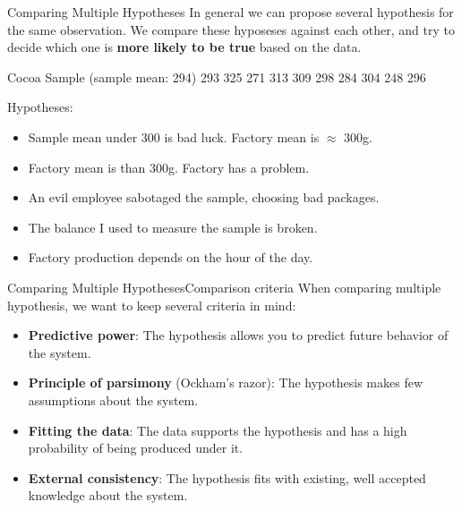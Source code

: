 \begin{frame}{Comparing Multiple Hypotheses}
  In general we can propose several hypothesis for the same observation. We  compare these hyposeses against each other, and try to decide which one is {\bf more likely to be true} based on the data.

  \begin{block}{Cocoa Sample (sample mean: 294)}
    293 325 \alert{271} 313 309 298 284 304 \alert{248} 296\\
  \end{block}\bigskip

  Hypotheses:
  \begin{itemize}
    \item Sample mean under 300 is bad luck. Factory mean is $\approx$ 300g.
    \item Factory mean is than 300g. Factory has a problem.
    \item An evil employee sabotaged the sample, choosing bad packages.
    \item The balance I used to measure the sample is broken.
    \item Factory production depends on the hour of the day.
  \end{itemize}
\end{frame}

\begin{frame}{Comparing Multiple Hypotheses}{Comparison criteria}
  When comparing multiple hypothesis, we want to keep several criteria in mind:
  \begin{itemize}
    \item {\bf Predictive power}: The hypothesis allows you to predict future behavior of the system.\medskip
    \item {\bf Principle of parsimony} (Ockham's razor): The hypothesis makes few assumptions about the system.\medskip
    \item {\bf Fitting the data}: The data supports the hypothesis and has a high probability of being produced under it.\medskip
    \item {\bf External consistency}: The hypothesis fits with existing, well accepted knowledge about the system.\medskip
  \end{itemize}
\end{frame}

